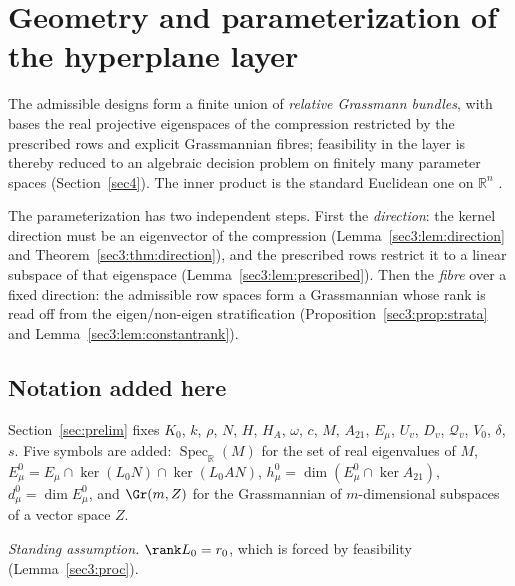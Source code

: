 
\section{Geometry and parameterization of the hyperplane layer}
\label{sec3}
The admissible designs form a finite union of \emph{relative Grassmann bundles}, with bases the real
projective eigenspaces of the compression restricted by the prescribed rows and explicit Grassmannian
fibres; feasibility in the layer is thereby reduced to an algebraic decision problem on finitely many
parameter spaces (Section~\ref{sec4}). The inner product is the standard Euclidean one on
$\mathbb{R}^n$ \cite{hj13}.

The parameterization has two independent steps. First the \emph{direction}: the kernel direction must
be an eigenvector of the compression (Lemma~\ref{sec3:lem:direction} and
Theorem~\ref{sec3:thm:direction}), and the prescribed rows restrict it to a linear subspace of that
eigenspace (Lemma~\ref{sec3:lem:prescribed}). Then the \emph{fibre} over a fixed direction: the
admissible row spaces form a Grassmannian whose rank is read off from the eigen/non-eigen
stratification (Proposition~\ref{sec3:prop:strata} and Lemma~\ref{sec3:lem:constantrank}).

\subsection{Notation added here}
\label{sec3:sub:notation}
Section~\ref{sec:prelim} fixes $K_0$, $k$, $\rho$, $N$, $H$, $H_A$, $\omega$, $c$, $M$, $A_{21}$,
$E_\mu$, $U_v$, $D_v$, $\mathcal Q_v$, $V_0$, $\delta$, $s$. Five symbols are added:
$\operatorname{Spec}_{\mathbb R}(M)$ for the set of real eigenvalues of $M$,
$E_\mu^0=E_\mu\cap\ker(L_0N)\cap\ker(L_0AN)$,
$h_\mu^0=\dim(E_\mu^0\cap\ker A_{21})$, $d_\mu^0=\dim E_\mu^0$, and $\Gr(m,Z)$ for the Grassmannian of
$m$-dimensional subspaces of a vector space $Z$.

\noindent\emph{Standing assumption.} $\rank L_0=r_0$, which is forced by feasibility
(Lemma~\ref{sec3:proc}).

